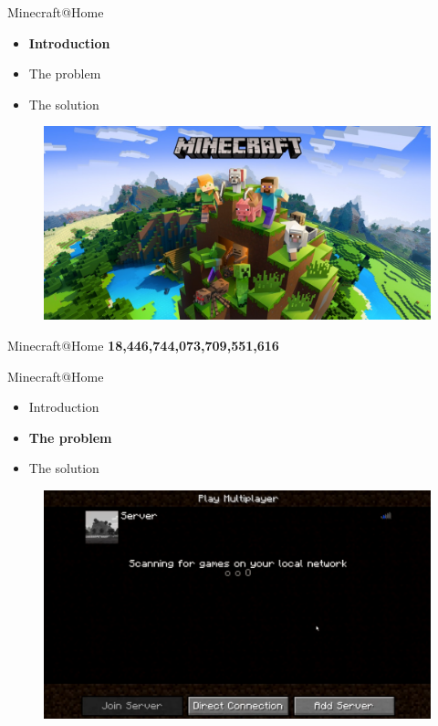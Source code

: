 \documentclass{beamer}
\begin{document}
\begin{frame}{Minecraft@Home}
\begin{itemize}
\item \textbf{Introduction}
\item The problem
\item The solution
\end{itemize}
\begin{figure}
  \includegraphics[scale=0.15]{minecraft.jpg}
\end{figure}
\end{frame}
\begin{frame}{Minecraft@Home}
\huge \textbf{18,446,744,073,709,551,616}
\end{frame}
%
\begin{frame}{Minecraft@Home}
\begin{itemize}
\item Introduction
\item \textbf{The problem}
\item The solution
\end{itemize}
\begin{figure}
  \includegraphics[scale=0.15]{pack.png}
\end{figure}
\end{frame}
\end{document}
